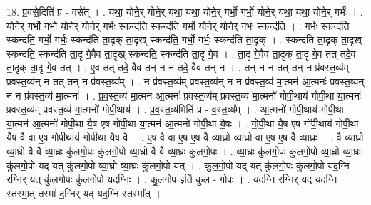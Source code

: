 \documentclass[17pt]{extarticle}
\begin{document}
18. प्र॒वसे॒दिति॑ प्र - वसे᳚त् । . यथा॒ योने॒र् योने॒र् यथा॒ यथा॒ योने॒र् गर्भो॒ गर्भो॒ योने॒र् यथा॒ यथा॒ योने॒र् गर्भः॑ । . योने॒र् गर्भो॒ गर्भो॒ योने॒र् योने॒र् गर्भः॒ स्कन्द॑ति॒ स्कन्द॑ति॒ गर्भो॒ योने॒र् योने॒र् गर्भः॒ स्कन्द॑ति । . गर्भः॒ स्कन्द॑ति॒ स्कन्द॑ति॒ गर्भो॒ गर्भः॒ स्कन्द॑ति ता॒दृक् ता॒दृख् स्कन्द॑ति॒ गर्भो॒ गर्भः॒ स्कन्द॑ति ता॒दृक् । . स्कन्द॑ति ता॒दृक् ता॒दृख् स्कन्द॑ति॒ स्कन्द॑ति ता॒दृ गे॒वैव ता॒दृख् स्कन्द॑ति॒ स्कन्द॑ति ता॒दृ गे॒व । . ता॒दृ गे॒वैव ता॒दृक् ता॒दृ गे॒व तत् तदे॒व ता॒दृक् ता॒दृ गे॒व तत् । . ए॒व तत् तदे॒ वैव तन् न न तदे॒ वैव तन् न । . तन् न न तत् तन् न प्र॑वस्त॒व्य॑म् प्रवस्त॒व्य॑न् न तत् तन् न प्र॑वस्त॒व्य᳚म् । . न प्र॑वस्त॒व्य॑म् प्रवस्त॒व्य॑न् न न प्र॑वस्त॒व्य॑ मा॒त्मन॑ आ॒त्मनः॑ प्रवस्त॒व्य॑न् न न प्र॑वस्त॒व्य॑ मा॒त्मनः॑ । . प्र॒व॒स्त॒व्य॑ मा॒त्मन॑ आ॒त्मनः॑ प्रवस्त॒व्य॑म् प्रवस्त॒व्य॑ मा॒त्मनो॑ गोपी॒थाय॑ गोपी॒था या॒त्मनः॑ प्रवस्त॒व्य॑म् प्रवस्त॒व्य॑ मा॒त्मनो॑ गोपी॒थाय॑ । . प्र॒व॒स्त॒व्य॑मिति॑ प्र - व॒स्त॒व्य᳚म् । . आ॒त्मनो॑ गोपी॒थाय॑ गोपी॒था या॒त्मन॑ आ॒त्मनो॑ गोपी॒था यै॒ष ए॒ष गो॑पी॒था या॒त्मन॑ आ॒त्मनो॑ गोपी॒था यै॒षः । . गो॒पी॒था यै॒ष ए॒ष गो॑पी॒थाय॑ गोपी॒था यै॒ष वै वा ए॒ष गो॑पी॒थाय॑ गोपी॒था यै॒ष वै । . ए॒ष वै वा ए॒ष ए॒ष वै व्या॒घ्रो व्या॒घ्रो वा ए॒ष ए॒ष वै व्या॒घ्रः । . वै व्या॒घ्रो व्या॒घ्रो वै वै व्या॒घ्रः कु॑लगो॒पः कु॑लगो॒पो व्या॒घ्रो वै वै व्या॒घ्रः कु॑लगो॒पः । . व्या॒घ्रः कु॑लगो॒पः कु॑लगो॒पो व्या॒घ्रो व्या॒घ्रः कु॑लगो॒पो यद् यत् कु॑लगो॒पो व्या॒घ्रो व्या॒घ्रः कु॑लगो॒पो यत् । . कु॒ल॒गो॒पो यद् यत् कु॑लगो॒पः कु॑लगो॒पो यद॒ग्नि र॒ग्निर् यत् कु॑लगो॒पः कु॑लगो॒पो यद॒ग्निः । . कु॒ल॒गो॒प इति॑ कुल - गो॒पः । . यद॒ग्नि र॒ग्निर् यद् यद॒ग्नि स्तस्मा॒त् तस्मा॑ द॒ग्निर् यद् यद॒ग्नि स्तस्मा᳚त् । \newline
\end{document}
